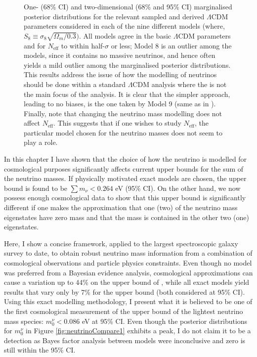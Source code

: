 \begin{figure}
\begin{center}
\caption[One- (68\% CI) and two-dimensional (68\% and 95\% CI) marginalised posterior distributions for the relevant sampled and derived $\Lambda$CDM parameters in each of the nine different models.]{One- (68\% CI) and two-dimensional (68\% and 95\% CI) marginalised posterior distributions for the relevant sampled and derived $\Lambda$CDM parameters considered in each of the nine different models (where, $S_8 \equiv \sigma_8\sqrt{\Omega_m/0.3})$. All models agree in the basic $\Lambda$CDM parameters and for $N_{\text{eff}}$ to within half-$\sigma$ or less; Model 8 is an outlier among the models, since it contains no massive neutrinos, and hence often yields a mild outlier among the marginalised posterior distributions. This results address the issue of how the modelling of neutrinos should be done within a standard $\Lambda$CDM analysis where the \NM{} is not the main focus of the analysis. It is clear that the simpler approach, leading to no biases, is the one taken by Model 9 (same as in \cite{PlanckCosmology2016,2018PlanckCosmology}).  Finally, note that changing the neutrino mass modelling does not affect $N_{\text{eff}}$. This suggests that if one wishes to study $N_{\text{eff}}$, the particular model chosen for the neutrino masses does not seem to play a role.}
\label{fig:LCDM}
\end{center}
\end{figure}


In this chapter I have shown that the choice of how the neutrino is modelled for cosmological purposes significantly affects current upper bounds for the sum of the neutrino masses. If physically motivated exact models are chosen, the upper bound is found to be $\sum m_{\nu} < 0.264$ eV (95\% CI). On the other hand, we now possess enough cosmological data to show that this upper bound is significantly different if one makes the approximation that one (two) of the neutrino mass eigenstates have zero mass and that the mass is contained in the other two (one) eigenstates. 

\qquad Here, I show a concise framework, applied to the largest spectroscopic galaxy survey to date, to obtain robust neutrino mass information from a combination of cosmological observations and particle physics constraints. Even though no model was preferred from a Bayesian evidence analysis, cosmological approximations can cause a variation up to 44\% on the upper bound of \NM{}, while all exact models yield results that vary only by 7\% for the upper bound (both considered at 95\% CI). Using this exact modelling methodology, I present what it is believed to be one of the first cosmological measurement of the upper bound of the lightest neutrino mass species: $m_{0}^{\nu} < 0.086$ eV at 95\% CI. Even though the posterior distributions for $m_{0}^{\nu}$ in Figure \ref{fig:neutrinoCompare1} exhibits a peak, I do not claim it to be a detection as Bayes factor analysis between models were inconclusive and zero is still within the 95\% CI.

